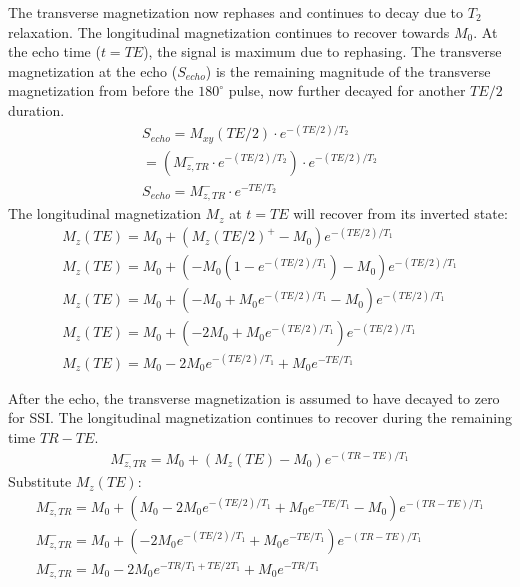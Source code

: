 \documentclass[10pt,a4paper,twoside]{article}
\begin{document}
The transverse magnetization now rephases and continues to decay due to $T_2$ relaxation. The longitudinal magnetization continues to recover towards $M_0$.
At the echo time ($t=TE$), the signal is maximum due to rephasing.
The transverse magnetization at the echo ($S_{echo}$) is the remaining magnitude of the transverse magnetization from before the $180^\circ$ pulse, now further decayed for another $TE/2$ duration.
\begin{gather*}
S_{echo} = M_{xy}(TE/2) \cdot e^{-(TE/2)/T_2} \\
= (M_{z,TR}^- \cdot e^{-(TE/2)/T_2}) \cdot e^{-(TE/2)/T_2} \\
S_{echo} = M_{z,TR}^- \cdot e^{-TE/T_2}
\end{gather*}
The longitudinal magnetization $M_z$ at $t=TE$ will recover from its inverted state:
\begin{gather*}
M_z(TE) = M_0 + (M_z(TE/2)^+ - M_0)e^{-(TE/2)/T_1} \\
M_z(TE) = M_0 + (-M_0(1 - e^{-(TE/2)/T_1}) - M_0)e^{-(TE/2)/T_1} \\
M_z(TE) = M_0 + (-M_0 + M_0 e^{-(TE/2)/T_1} - M_0)e^{-(TE/2)/T_1} \\
M_z(TE) = M_0 + (-2M_0 + M_0 e^{-(TE/2)/T_1})e^{-(TE/2)/T_1} \\
M_z(TE) = M_0 - 2M_0 e^{-(TE/2)/T_1} + M_0 e^{-TE/T_1}
\end{gather*}

\vspace{12pt}

After the echo, the transverse magnetization is assumed to have decayed to zero for SSI. The longitudinal magnetization continues to recover during the remaining time $TR-TE$.
\begin{gather*}
M_{z,TR}^- = M_0 + (M_z(TE) - M_0)e^{-(TR-TE)/T_1}
\end{gather*}
Substitute $M_z(TE)$:
\begin{gather*}
M_{z,TR}^- = M_0 + (M_0 - 2M_0 e^{-(TE/2)/T_1} + M_0 e^{-TE/T_1} - M_0)e^{-(TR-TE)/T_1} \\
M_{z,TR}^- = M_0 + (-2M_0 e^{-(TE/2)/T_1} + M_0 e^{-TE/T_1})e^{-(TR-TE)/T_1} \\
M_{z,TR}^- = M_0 - 2M_0 e^{-TR/T_1 + TE/2T_1} + M_0 e^{-TR/T_1}
\end{gather*}

\vspace{12pt}
\end{document}
